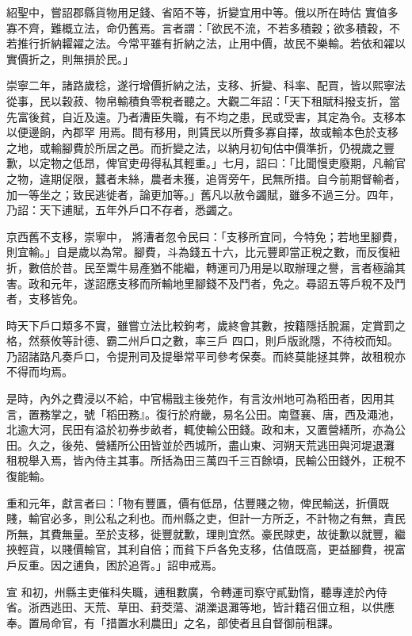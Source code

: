 \begin{pinyinscope}
 紹聖中，嘗詔郡縣貨物用足錢、省陌不等，折變宜用中等。俄以所在時估
 實值多寡不齊，難概立法，命仍舊焉。言者謂：「欲民不流，不若多積穀；欲多積穀，不若推行折納糶糴之法。今常平雖有折納之法，止用中價，故民不樂輸。若依和糴以實價折之，則無損於民。」



 崇寧二年，諸路歲稔，遂行增價折納之法，支移、折變、科率、配買，皆以熙寧法從事，民以穀菽、物帛輸積負零稅者聽之。大觀二年詔：「天下租賦科撥支折，當先富後貧，自近及遠。乃者漕臣失職，有不均之患，民或受害，其定為令。支移本以便邊餉，內郡罕
 用焉。間有移用，則賃民以所費多寡自擇，故或輸本色於支移之地，或輸腳費於所居之邑。而折變之法，以納月初旬估中價準折，仍視歲之豐歉，以定物之低昂，俾官吏毋得私其輕重。」七月，詔曰：「比聞慢吏廢期，凡輸官之物，違期促限，蠶者未絲，農者未獲，追胥旁午，民無所措。自今前期督輸者，加一等坐之；致民逃徙者，論更加等。」舊凡以赦令蠲賦，雖多不過三分。四年，乃詔：天下逋賦，五年外戶口不存者，悉蠲之。



 京西舊不支移，崇寧中，
 將漕者忽令民曰：「支移所宜同，今特免；若地里腳費，則宜輸。」自是歲以為常。腳費，斗為錢五十六，比元豐即當正稅之數，而反復紐折，數倍於昔。民至鬻牛易產猶不能繼，轉運司乃用是以取辦理之譽，言者極論其害。政和元年，遂詔應支移而所輸地里腳錢不及鬥者，免之。尋詔五等戶稅不及鬥者，支移皆免。



 時天下戶口類多不實，雖嘗立法比較鉤考，歲終會其數，按籍隱括脫漏，定賞罰之格，然蔡攸等計德、霸二州戶口之數，率三戶
 四口，則戶版訛隱，不待校而知。乃詔諸路凡奏戶口，令提刑司及提舉常平司參考保奏。而終莫能拯其弊，故租稅亦不得而均焉。



 是時，內外之費浸以不給，中官楊戩主後苑作，有言汝州地可為稻田者，因用其言，置務掌之，號「稻田務』。復行於府畿，易名公田。南暨襄、唐，西及澠池，北逾大河，民田有溢於初券步畝者，輒使輸公田錢。政和末，又置營繕所，亦為公田。久之，後苑、營繕所公田皆並於西城所，盡山東、河朔天荒逃田與河堤退灘
 租稅舉入焉，皆內侍主其事。所括為田三萬四千三百餘頃，民輸公田錢外，正稅不復能輸。



 重和元年，獻言者曰：「物有豐匱，價有低昂，估豐賤之物，俾民輸送，折價既賤，輸官必多，則公私之利也。而州縣之吏，但計一方所乏，不計物之有無，責民所無，其費無量。至於支移，徙豐就歉，理則宜然。豪民賕吏，故徙歉以就豐，繼挾輕貨，以賤價輸官，其利自倍；而貧下戶各免支移，估值既高，更益腳費，視富戶反重。因之逋負，困於追胥。」詔申戒焉。



 宣
 和初，州縣主吏催科失職，逋租數廣，令轉運司察守貳勤惰，聽專達於內侍省。浙西逃田、天荒、草田、葑茭蕩、湖濼退灘等地，皆計籍召佃立租，以供應奉。置局命官，有「措置水利農田」之名，部使者且自督御前租課。




\end{pinyinscope}
